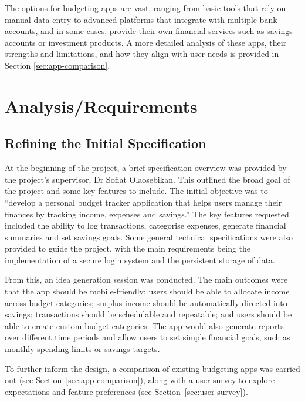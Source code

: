 \documentclass{l4proj}
\begin{document}
The options for budgeting apps are vast, ranging from basic tools that rely on manual data entry to advanced platforms that integrate with multiple bank accounts, and in some cases, provide their own financial services such as savings accounts or investment products. A more detailed analysis of these apps, their strengths and limitations, and how they align with user needs is provided in Section \ref{sec:app-comparison}.


\chapter{Analysis/Requirements}
\section{Refining the Initial Specification}

At the beginning of the project, a brief specification overview was provided by the project's supervisor, Dr Sofiat Olaosebikan. This outlined the broad goal of the project and some key features to include. The initial objective was to ``develop a personal budget tracker application that helps users manage their finances by tracking income, expenses and savings.'' The key features requested included the ability to log transactions, categorise expenses, generate financial summaries and set savings goals. Some general technical specifications were also provided to guide the project, with the main requirements being the implementation of a secure login system and the persistent storage of data.

From this, an idea generation session was conducted. The main outcomes were that the app should be mobile-friendly; users should be able to allocate income across budget categories; surplus income should be automatically directed into savings; transactions should be schedulable and repeatable; and users should be able to create custom budget categories. The app would also generate reports over different time periods and allow users to set simple financial goals, such as monthly spending limits or savings targets.

To further inform the design, a comparison of existing budgeting apps was carried out (see Section~\ref{sec:app-comparison}), along with a user survey to explore expectations and feature preferences (see Section~\ref{sec:user-survey}).
\end{document}
